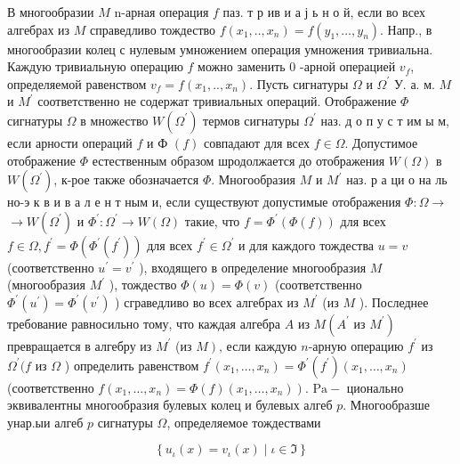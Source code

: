 \documentclass[10pt]{article}
\begin{document}
В многообразии $M$ n-арная операция $f$ паз. т р ив и а ј ь н о й, если во всех алгебрах из $M$ справедливо тождество $f\left(x_{1}, . ., x_{n}\right)=f\left(y_{1}, \ldots, y_{n}\right)$. Напр., в многообразии колец с нулевым умножением операция умножения тривиальна. Каждую тривиальную операцию $f$ можно заменить 0 -арной операцией $v_{f}$, определяемой равенством $v_{f}=f\left(x_{1}, . ., x_{n}\right)$. Пусть сигнатуры $\Omega$ и $\Omega^{\prime}$ У. а. м. $M$ и $M^{\prime}$ соответственно не содержат тривиальных операций. Отображение $\Phi$ сигнатуры $\Omega$ в множество $W\left(\Omega^{\prime}\right)$ термов сигнатуры $\Omega^{\prime}$ наз. д о п у с т им ы м, если арности операций $f$ и Ф $(f)$ совпадают для всех $f \in \Omega$. Допустимое отображение $\Phi$ естественным образом шродолжается до отображения $W(\Omega)$ в $W\left(\Omega^{\prime}\right)$, к-рое также обозначается $\Phi$. Многообразия $M$ и $M^{\prime}$ наз. р а ци о на ль но-э к в и в а л е н т ным и, если существуют допустимые отображения $\Phi: \Omega \rightarrow$ $\rightarrow W\left(\Omega^{\prime}\right)$ и $\Phi^{\prime}: \Omega^{\prime} \rightarrow W(\Omega)$ такие, что $f=\Phi^{\prime}(\Phi(f))$ для всех $f \in \Omega, f^{\prime}=\Phi\left(\Phi^{\prime}\left(f^{\prime}\right)\right)$ для всех $f^{\prime} \in \Omega^{\prime}$ и для каждого тождества $u=v$ (соответственно $u^{\prime}=v^{\prime}$ ), входящего в определение многообразия $M$ (многообразия $M^{\prime}$ ), тождество $\Phi(u)=\Phi(v)$ (соответственно $\Phi^{\prime}\left(u^{\prime}\right)=\Phi^{\prime}\left(v^{\prime}\right)$ ) сграведливо во всех алгебрах из $M^{\prime}$ (из $M$ ). Последнее требование равносильно тому, что каждая алгебра $A$ из $M\left(A^{\prime}\right.$ из $\left.M^{\prime}\right)$ превращается в алгебру из $M^{\prime}$ (из $\left.M\right)$, если каждую $n$-арную операцию $f^{\prime}$ из $\Omega^{\prime}(f$ из $\Omega$ ) определить равенством $f^{\prime}\left(x_{1}, \ldots, x_{n}\right)=\Phi^{\prime}\left(f^{\prime}\right)\left(x_{1}, \ldots, x_{n}\right)$ (соответственно $\left.f\left(x_{1}, \ldots, x_{n}\right)=\Phi(f)\left(x_{1}, \ldots, x_{n}\right)\right)$. $\mathrm{Pa}-$ ционально эквивалентны многообразия булевых колец и булевых алгеб $p$. Многообразше унар.ыи алгеб $p$ сигнатуры $\Omega$, определяемое тождествами



\[

\left\{u_{\iota}(x)=v_{\iota}(x) \mid \iota \in \Im\right\}

\]
\end{document}
